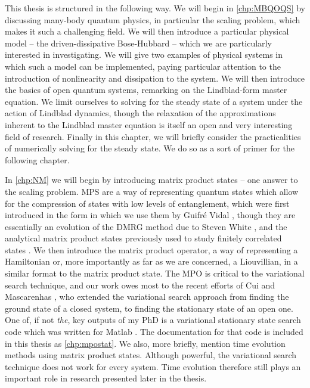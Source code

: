 This thesis is structured in the following way. We will begin in \cref{chp:MBQOQS} by discussing many-body quantum physics, in particular the scaling problem, which makes it such a challenging field. We will then introduce a particular physical model -- the driven-dissipative Bose-Hubbard -- which we are particularly interested in investigating. We will give two examples of physical systems in which such a model can be implemented, paying particular attention to the introduction of nonlinearity and dissipation to the system. We will then introduce the basics of open quantum systems, remarking on the Lindblad-form master equation. We limit ourselves to solving for the steady state of a system under the action of Lindblad dynamics, though the relaxation of the approximations inherent to the Lindblad master equation is itself an open and very interesting field of research. Finally in this chapter, we will briefly consider the practicalities of numerically solving for the steady state. We do so as a sort of primer for the following chapter.

In \cref{chp:NM} we will begin by introducing matrix product states -- one answer to the scaling problem. MPS are a way of representing quantum states which allow for the compression of states with low levels of entanglement, which were first introduced in the form in which we use them by Guifr\'{e} Vidal \cite{Vidal2003,Vidal2004}, though they are essentially an evolution of the DMRG method due to Steven White \cite{White1992,White1993}, and the analytical matrix product states previously used to study finitely correlated states \cite{Affleck1987}. We then introduce the matrix product operator, a way of representing a Hamiltonian or, more importantly as far as we are concerned, a Liouvillian, in a similar format to the matrix product state. The MPO is critical to the variational search technique, and our work owes most to the recent efforts of Cui \cite{Cui2015} and Mascarenhas \cite{Mascarenhas2015}, who extended the variational search approach from finding the ground state of a closed system, to finding the stationary state of an open one. One of, if not \emph{the}, key outputs of my PhD is a variational stationary state search code \cite{otb:gitVSSS} which was written for Matlab \cite{MATLAB}. The documentation for that code is included in this thesis as \cref{chp:mpostat}. We also, more briefly, mention time evolution methods using matrix product states. Although powerful, the variational search technique does not work for every system. Time evolution therefore still plays an important role in research presented later in the thesis.

